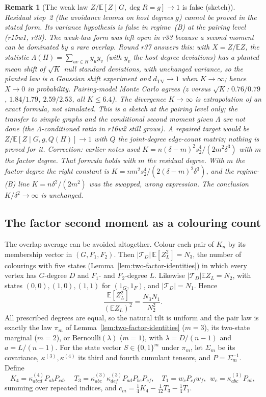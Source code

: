 \documentclass[11pt]{article}
\newtheorem{remark}[theorem]{Remark}
\newcommand{\EE}{\mathbb{E}}
\newcommand{\dTV}{d_{\mathrm{TV}}}
\begin{document}
\begin{remark}[{The weak law \(Z/\EE[Z\mid G,\deg R=g]\to1\) is false (sketch)}]
\label{rem:weak-law-false}
Residual step~2 (the avoidance lemma on host degrees \(g\)) cannot be proved in
the stated form. Its variance hypothesis is false in regime~(B) at the pairing
level (r15w1, r33). The weak-law form was left open in r33 because a second moment
can be dominated by a rare overlap. Round r37 answers this: with \(X=Z/\EE Z\), the
statistic \(\Lambda(H)=\sum_{uv\in H}y_uy_v\) (with \(y_v\) the host-degree
deviations) has a planted mean shift of
\(\sqrt K\) null standard deviations, with unchanged variance, so the planted law is a
Gaussian shift experiment and \(\dTV\to1\) when \(K\to\infty\); hence
\(X\to0\) in probability. Pairing-model Monte Carlo agrees (\(z\) versus
\(\sqrt K\): \(0.76/0.79\), \(1.84/1.79\), \(2.59/2.53\), all \(K\le6.4\)). The divergence
\(K\to\infty\) is extrapolation of an exact formula, not simulated. This is a sketch
at the pairing level only; the transfer to simple graphs and the conditional second
moment given \(\Lambda\) are not done (the \(\Lambda\)-conditioned ratio in r16w2 still grows). A
repaired target would be \(Z/\EE[Z\mid G,g,Q(H)]\to1\) with \(Q\) the joint-degree
edge-count matrix; nothing is proved for it.
Correction: earlier notes used \(K=n(\delta-m)^2s_2^4/(2m^2\delta^3)\) with
\(m\) the factor degree. That formula holds with \(m\) the \emph{residual} degree.
With \(m\) the factor degree the right constant is
\(K=nm^2s_2^4/(2(\delta-m)^2\delta^3)\), and the regime-(B) line
\(K=n\delta^2/(2m^2)\) was the swapped, wrong expression. The conclusion
\(K/\delta^2\to\infty\) is unchanged.
\end{remark}

\subsection*{The factor second moment as a colouring count}

The overlap average can be avoided altogether.
Colour each pair of \(K_n\) by its membership vector in \((G,F_1,F_2)\).
Then \(|\mathcal T_D|\,\EE[Z_L^2]=N_3\), the number of colourings with five
states (Lemma~\ref{lem:two-factor-identities}) in which every vertex has
\(G\)-degree \(D\) and \(F_1\)- and \(F_2\)-degree \(L\).
Likewise \(|\mathcal T_D|\EE Z_L=N_2\), with states \((0,0),(1,0),(1,1)\)
for \((1_G,1_F)\), and \(|\mathcal T_D|=N_1\). Hence
\[
\frac{\EE[Z_L^2]}{(\EE Z_L)^2}=\frac{N_3N_1}{N_2^2}.
\]
All prescribed degrees are equal, so the natural tilt is uniform and the
pair law is exactly the law \(\pi_m\) of Lemma~\ref{lem:two-factor-identities}
(\(m=3\)), its two-state marginal (\(m=2\)), or Bernoulli\((\lambda)\) (\(m=1\)),
with \(\lambda=D/(n-1)\) and \(a=L/(n-1)\).
For the state vector \(S\in\{0,1\}^m\) under \(\pi_m\), let \(\Sigma_m\) be
its covariance, \(\kappa^{(3)},\kappa^{(4)}\) its third and fourth cumulant
tensors, and \(P=\Sigma_m^{-1}\). Define
\[
K_4=\kappa^{(4)}_{abcd}P_{ab}P_{cd},\quad
T_3=\kappa^{(3)}_{abc}\kappa^{(3)}_{def}P_{ad}P_{be}P_{cf},\quad
T_1=w_cP_{cf}w_f,\ \ w_c=\kappa^{(3)}_{abc}P_{ab},
\]
summing over repeated indices, and \(c_m=\tfrac14K_4-\tfrac1{12}T_3-\tfrac14T_1\).
\end{document}
